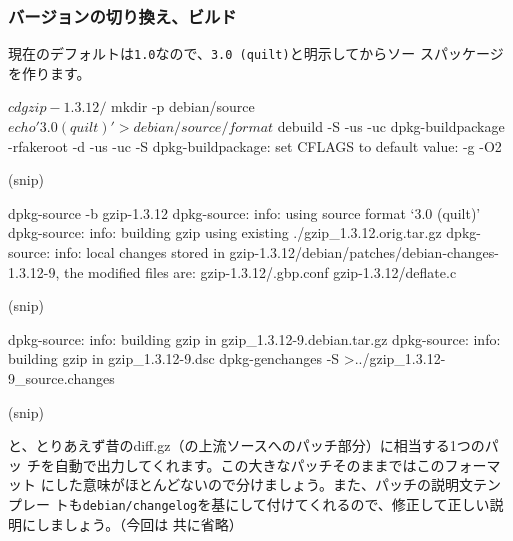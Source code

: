 \documentclass[mingoth,a4paper]{jsarticle}
\begin{document}
\subsubsection{バージョンの切り換え、ビルド}
現在のデフォルトは\verb|1.0|なので、\verb|3.0 (quilt)|と明示してからソー
スパッケージを作ります。
\begin{commandline}
$ cd gzip-1.3.12/
$ mkdir -p debian/source
$ echo '3.0 (quilt)' > debian/source/format
$ debuild -S -us -uc
 dpkg-buildpackage -rfakeroot -d -us -uc -S
dpkg-buildpackage: set CFLAGS to default value: -g -O2

(snip)

 dpkg-source -b gzip-1.3.12
dpkg-source: info: using source format `3.0 (quilt)'
dpkg-source: info: building gzip using existing ./gzip_1.3.12.orig.tar.gz
dpkg-source: info: local changes stored in gzip-1.3.12/debian/patches/debian-changes-1.3.12-9, the modified files are:
 gzip-1.3.12/.gbp.conf
 gzip-1.3.12/deflate.c

(snip)

dpkg-source: info: building gzip in gzip_1.3.12-9.debian.tar.gz
dpkg-source: info: building gzip in gzip_1.3.12-9.dsc
 dpkg-genchanges -S >../gzip_1.3.12-9_source.changes

(snip)
\end{commandline}
と、とりあえず昔のdiff.gz（の上流ソースへのパッチ部分）に相当する1つのパッ
チを自動で出力してくれます。この大きなパッチそのままではこのフォーマット
にした意味がほとんどないので分けましょう。また、パッチの説明文テンプレー
トも\verb|debian/changelog|を基にして付けてくれるので、修正して正しい説明にしましょう。（今回は
共に省略）
\end{document}
